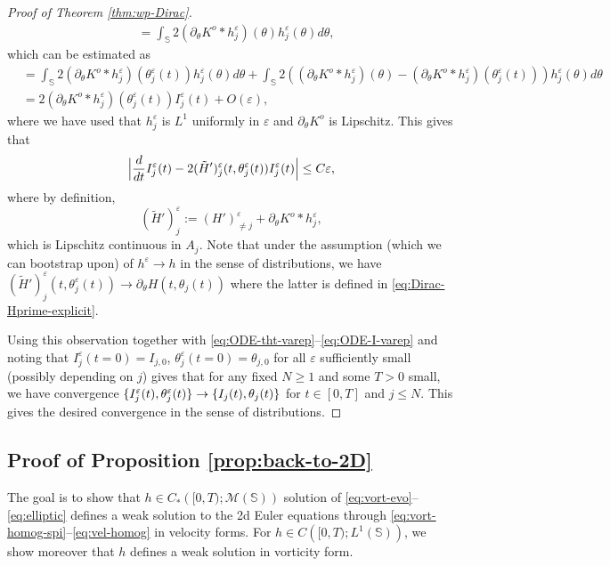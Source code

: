 \documentclass[JEP,XML,SOM,Unicode,NoFloatCountersInSection,published]{cedram}
\theoremstyle{plain}
\theoremstyle{definition}
\let\rd\partial
\let\tht\theta
\let\varep\varepsilon
\newcommand{\bbS}{\mathbb S}
\begin{document}
\begin{proof}[Proof of Theorem \ref{thm:wp-Dirac}]
\begin{equation*}
\begin{split}
& = \int_{\bbS} 2 (\rd_\tht K^o *h^\varep_j) (\tht) h^\varep_j(\tht) d\tht,
\end{split}
\end{equation*}
which can be estimated as
\begin{equation*}
\begin{split}
& = \int_{\bbS} 2 (\rd_\tht K^o *h^\varep_j) (\tht^\varep_j(t)) h^\varep_j(\tht) d\tht + \int_{\bbS} 2((\rd_\tht K^o *h^\varep_j) (\tht) - (\rd_\tht K^o *h^\varep_j) (\tht^\varep_j(t))) h^\varep_j(\tht) d\tht \\
& = 2(\rd_\tht K^o *h^\varep_j) (\tht^\varep_j(t)) I^\varep_j(t) + O(\varep),
\end{split}
\end{equation*}
where we have used that $h^\varep_j$ is $L^1$ uniformly in $\varep $ and $\rd_\tht K^o$ is Lipschitz. This gives that
\begin{equation}\label{eq:ODE-I-varep}
\Bigl| \frac{d}{dt} I^\varep_{j} (t) - 2 (\tilde{H}')^\varep_{j}(t, \tht^\varep_{j}(t)) I^\varep_{j} (t) \Bigr| \le C\varep,
\end{equation}
where by definition,
\begin{equation*}
(\tilde{H}')^\varep_{j} := (H')^\varep_{\ne j} + \rd_\tht K^o *h^\varep_j,
\end{equation*}
which is Lipschitz continuous in $A_{j}$. Note that under the assumption (which we can bootstrap upon) of $h^\varep \to h$ in the sense of distributions, we have $(\tilde{H}')^\varep_{j}(t,\tht^\varep_{j}(t)) \to \partial_{\theta} H(t,\tht_{j}(t))$ where the latter is defined in \eqref{eq:Dirac-Hprime-explicit}.

Using this observation together with \eqref{eq:ODE-tht-varep}--\eqref{eq:ODE-I-varep} and noting that $I^{\varep}_{j}(t=0) = I_{j,0}$, $\tht^{\varep}_{j}(t=0) = \tht_{j,0}$ for all $\varep$ sufficiently small (possibly depending on $j$) gives that for any fixed $N\ge1$ and some $T>0$ small, we have convergence $\{ I^{\varep}_{j}(t), \tht^{\varep}_{j}(t) \} \to\nobreak \{ I_{j}(t), \tht_{j}(t) \}$ for $t \in [0,T]$ and $j\le N$. This gives the desired convergence in the sense of distributions.
\end{proof}

\subsection{Proof of Proposition \ref{prop:back-to-2D}}
The goal is to show that $h\in C_*\left([0,T);\mathcal{M}\left(\mathbb{S}\right)\right)$ solution of \eqref{eq:vort-evo}--\eqref{eq:elliptic} defines a weak solution to the 2d Euler equations through \eqref{eq:vort-homog-spi}--\eqref{eq:vel-homog} in velocity forms. For $h\in C\left([0,T);L^1\left(\mathbb{S}\right)\right)$, we show moreover that $h$ defines a weak solution in vorticity form.
\end{document}
